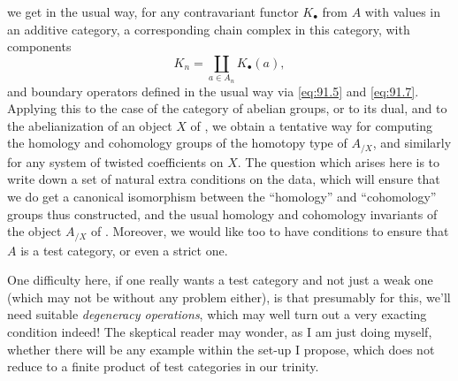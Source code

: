 we get in the usual way, for any contravariant functor $K_\bullet$
from $A$ with values in an additive category, a corresponding chain
complex in this category, with components
\begin{equation}
  \label{eq:91.9}
  K_n = \coprod_{a\in A_n} K_\bullet(a),\tag{9}
\end{equation}
and boundary operators defined in the usual way via \eqref{eq:91.5}
and \eqref{eq:91.7}. Applying this to the case of the category \Ab{}
of abelian groups, or to its dual, and to the abelianization of an
object $X$ of \Ahat, we obtain a tentative way for computing the
homology and cohomology groups of the homotopy type of $A_{/X}$, and
similarly for any system of twisted coefficients on $X$. The question
which arises here is to write down a set of natural extra conditions
on the data, which will ensure that we do get a canonical isomorphism
between the ``homology'' and ``cohomology'' groups thus constructed,
and the usual homology and cohomology invariants of the object
$A_{/X}$ of \Cat. Moreover, we would like too to have conditions to
ensure that $A$ is a test category, or even a strict one.

One difficulty here, if one really wants a test category and not just
a weak one (which may not be without any problem either), is that
presumably for this, we'll need suitable \emph{degeneracy operations},
which may well turn out a very exacting condition indeed! The
skeptical reader may wonder, as I am just doing myself, whether there
will be any example within the set-up I propose, which does not reduce
to a finite product of test categories in our trinity.

